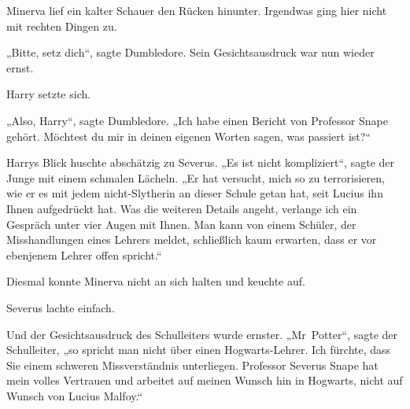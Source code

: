 Minerva lief ein kalter Schauer den Rücken hinunter. Irgendwas ging hier nicht mit rechten Dingen zu.

„Bitte, setz dich“, sagte Dumbledore. Sein Gesichtsausdruck war nun wieder ernst.

Harry setzte sich.

„Also, Harry“, sagte Dumbledore.
„Ich habe einen Bericht von Professor Snape gehört. Möchtest du mir in deinen eigenen Worten sagen, was passiert ist?“

Harrys Blick huschte abschätzig zu Severus.
„Es ist nicht kompliziert“, sagte der Junge mit einem schmalen Lächeln.
„Er hat versucht, mich so zu terrorisieren, wie er es mit jedem nicht-Slytherin an dieser Schule getan hat, seit Lucius ihn Ihnen aufgedrückt hat. Was die weiteren Details angeht, verlange ich ein Gespräch unter vier Augen mit Ihnen. Man kann von einem Schüler, der Misshandlungen eines Lehrers meldet, schließlich kaum erwarten, dass er vor ebenjenem Lehrer offen spricht.“

Diesmal konnte Minerva nicht an sich halten und keuchte auf.

Severus lachte einfach.

Und der Gesichtsausdruck des Schulleiters wurde ernster.
„Mr~Potter“, sagte der Schulleiter, „so spricht man nicht über einen Hogwarts-Lehrer. Ich fürchte, dass Sie einem schweren Missverständnis unterliegen. Professor Severus Snape hat mein volles Vertrauen und arbeitet auf meinen Wunsch hin in Hogwarts, nicht auf Wunsch von Lucius Malfoy.“

